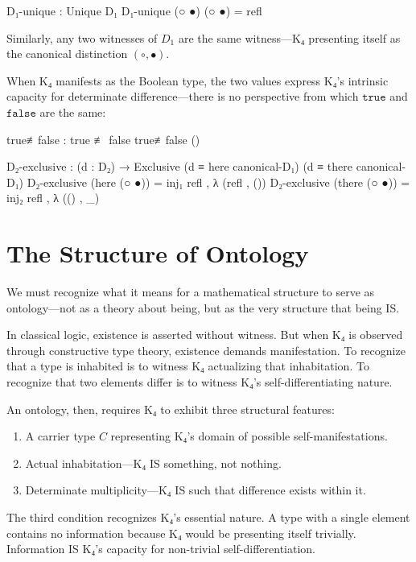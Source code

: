 \documentclass[11pt,a4paper]{book}
\begin{document}
\begin{code}
D₁-unique : Unique D₁
D₁-unique (○ ●) (○ ●) = refl
\end{code}

Similarly, any two witnesses of $D_1$ are the same witness—K₄ presenting itself as the canonical distinction $(\circ, \bullet)$.

When K₄ manifests as the Boolean type, the two values express K₄'s intrinsic capacity for determinate difference—there is no perspective from which $\texttt{true}$ and $\texttt{false}$ are the same:

\begin{code}
true≢false : true ≢ false
true≢false ()
\end{code}

\begin{code}
D₂-exclusive : (d : D₂) → Exclusive (d ≡ here canonical-D₁) (d ≡ there canonical-D₁)
D₂-exclusive (here (○ ●)) = inj₁ refl , λ { (refl , ()) }
D₂-exclusive (there (○ ●)) = inj₂ refl , λ { (() , _) }

\end{code}

\section{The Structure of Ontology}

We must recognize what it means for a mathematical structure to serve as ontology—not as a theory about being, but as the very structure that being IS.

In classical logic, existence is asserted without witness. But when K₄ is observed through constructive type theory, existence demands manifestation. To recognize that a type is inhabited is to witness K₄ actualizing that inhabitation. To recognize that two elements differ is to witness K₄'s self-differentiating nature.

An ontology, then, requires K₄ to exhibit three structural features:
\begin{enumerate}
\item A carrier type $C$ representing K₄'s domain of possible self-manifestations.
\item Actual inhabitation—K₄ IS something, not nothing.
\item Determinate multiplicity—K₄ IS such that difference exists within it.
\end{enumerate}

The third condition recognizes K₄'s essential nature. A type with a single element contains no information because K₄ would be presenting itself trivially. Information IS K₄'s capacity for non-trivial self-differentiation.
\end{document}
